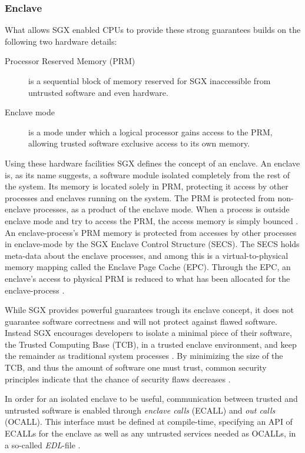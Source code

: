 \documentclass[12pt]{article}
\begin{document}
      \subsubsection{Enclave}
      What allows SGX enabled CPUs to provide these strong guarantees builds on the following two hardware details:
      \begin{description}
        \item [Processor Reserved Memory (PRM)] is a sequential block of memory reserved for SGX inaccessible from untrusted software and even hardware.
        \item [Enclave mode] is a mode under which a logical processor gains access to the PRM, allowing trusted software exclusive access to its own memory.
      \end{description}
      Using these hardware facilities SGX defines the concept of an enclave.
      An enclave is, as its name suggests, a software module isolated completely from the rest of the system.
      Its memory is located solely in PRM, protecting it access by other processes and enclaves running on the system. 
      The PRM is protected from non-enclave processes, as a product of the enclave mode. 
      When a process is outside enclave mode and try to access the PRM, the access memory is simply bounced \cite{intel-sgx-explained}.
      An enclave-process's PRM memory is protected from accesses by other processes in enclave-mode by the SGX Enclave Control Structure (SECS). 
      The SECS holds meta-data about the enclave processes, and among this is a virtual-to-physical memory mapping called the Enclave Page Cache (EPC). 
      Through the EPC, an enclave's access to physical PRM is reduced to what has been allocated for the enclave-process \cite{intel-sgx-explained}.

      While SGX provides powerful guarantees trough its enclave concept, it does not guarantee software correctness and will not protect against flawed software.
      Instead SGX encourages developers to isolate a minimal piece of their software, the Trusted Computing Base (TCB), in a trusted enclave environment, and keep the remainder as traditional system processes \cite{sgx-dev-guide}.
      By minimizing the size of the TCB, and thus the amount of software one must trust, common security principles indicate that the chance of security flaws decreases \cite{sgx-dev-guide}.

      In order for an isolated enclave to be useful, communication between trusted and untrusted software is enabled through \textit{enclave calls} (ECALL) and \textit{out calls} (OCALL).
      This interface must be defined at compile-time, specifying an API of ECALLs for the enclave as well as any untrusted services needed as OCALLs, in a so-called \textit{EDL}-file \cite{sgx-dev-guide}.
\end{document}
